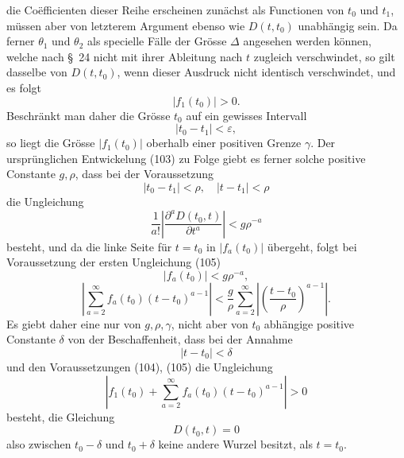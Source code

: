\documentclass[11pt,a4paper,leqno]{article}
\begin{document}
die Coëfficienten dieser Reihe erscheinen zunächst als Functionen von $t_0$ und $t_1$, müssen aber von letzterem Argument ebenso wie $D(t,t_0)$ unabhängig sein. Da ferner $\theta_1$ und $\theta_2$ als specielle Fälle der Grösse $\Delta$ angesehen werden können, welche nach \S~24 nicht mit ihrer Ableitung nach $t$ zugleich verschwindet, so gilt dasselbe von $D(t,t_0)$, wenn dieser Ausdruck nicht identisch verschwindet, und es folgt
\[
|f_1(t_0)|>0.
\]
Beschränkt man daher die Grösse $t_0$ auf ein gewisses Intervall
\begin{equation}\tag{104}
|t_0-t_1|<\varepsilon,
\end{equation}
so liegt die Grösse $|f_1(t_0)|$ oberhalb einer positiven Grenze $\gamma$. Der ursprünglichen Entwickelung (103) zu Folge giebt es ferner solche positive Constante $g,\rho$, dass bei der Voraussetzung
\begin{equation}\tag{105}
|t_0-t_1|<\rho,
\quad
|t-t_1|<\rho
\end{equation}
die Ungleichung
\[
\frac1{a!}\left|\frac{\partial^aD(t_0,t)}{\partial t^a}\right|<g\rho^{-a}
\]
besteht, und da die linke Seite für $t=t_0$ in $|f_a(t_0)|$ übergeht, folgt bei Voraussetzung der ersten Ungleichung (105)
\[
|f_a(t_0)|<g\rho^{-a},
\]
\[
\left|\sum_{a=2}^{\infty}f_a(t_0)(t-t_0)^{a-1}\right|
<\frac{g}{\rho}\sum_{a=2}^{\infty}\left|\left(\frac{t-t_0}{\rho}\right)^{a-1}\right|.
\]
Es giebt daher eine nur von $g,\rho,\gamma$, nicht aber von $t_0$ abhängige positive Constante $\delta$ von der Beschaffenheit, dass bei der Annahme
\[
|t-t_0|<\delta
\]
und den Voraussetzungen (104), (105) die Ungleichung
\[
\left|f_1(t_0)+\sum_{a=2}^{\infty}f_a(t_0)(t-t_0)^{a-1}\right|>0
\]
besteht, die Gleichung
\[
D(t_0,t)=0
\]
also zwischen $t_0-\delta$ und $t_0+\delta$ keine andere Wurzel besitzt, als $t=t_0$.
\end{document}
